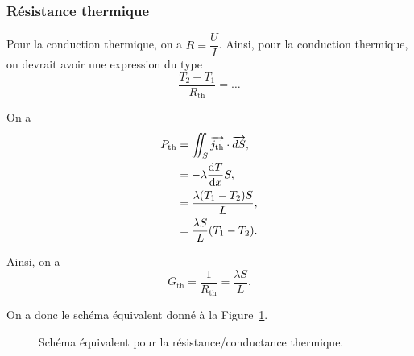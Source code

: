         \subsubsection{Résistance thermique}

            Pour la conduction thermique, on a $R=\dfrac{U}{I}$. Ainsi, pour la conduction thermique, on devrait avoir une expression du type
            \begin{equation}
                \frac{T_2-T_1}{R_{\text{th}}}=\dots
            \end{equation}

            On a 
            \begin{align}
                P_{\text{th}}
                &=\iint_{S}\protect\overrightarrow{{j_\text{th}}}\cdot\protect\overrightarrow{{dS}},\\
                &=
                -\lambda\frac{\mathrm{d} T}{\mathrm{d} x}S,\\
                &=
                \frac{\lambda(T_1-T_2)S}{L},\\
                &=\frac{\lambda S}{L}(T_1-T_2).
            \end{align}

            Ainsi, on a 
            \begin{equation}
                \boxed{
                    G_{\text{th}}=\frac{1}{R_{\text{th}}}=\frac{\lambda S}{L}.
                }
            \end{equation}

            On a donc le schéma équivalent donné à la Figure~\ref{fig:schema_equivalent_resistance_conductance_thermique}.
            \begin{figure}
                \centering
                \caption{Schéma équivalent pour la résistance/conductance thermique.}    
                \label{fig:schema_equivalent_resistance_conductance_thermique}
            \end{figure}

